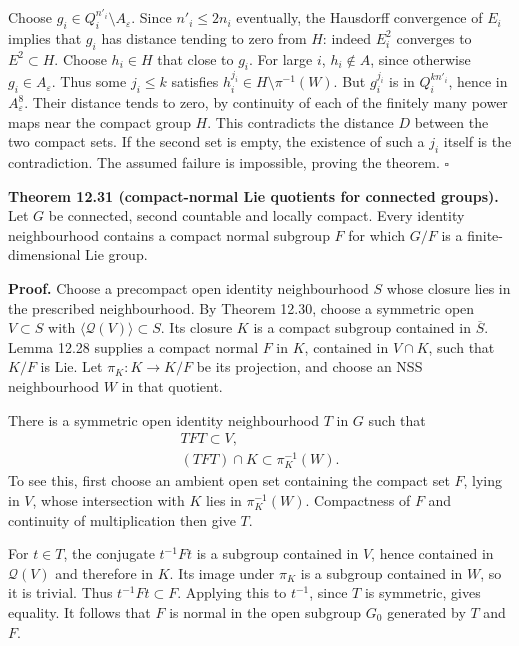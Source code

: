 \documentclass[
  11pt,
]{article}
\begin{document}
Choose \(g_i\in Q_i^{n'_i}\setminus A_\varepsilon\). Since
\(n'_i\leq2n_i\) eventually, the Hausdorff convergence of \(E_i\)
implies that \(g_i\) has distance tending to zero from \(H\): indeed
\(E_i^2\) converges to \(E^2\subset H\). Choose \(h_i\in H\) that close
to \(g_i\). For large \(i\), \(h_i\notin A\), since otherwise
\(g_i\in A_\varepsilon\). Thus some \(j_i\leq k\) satisfies
\(h_i^{j_i}\in H\setminus\pi^{-1}(W)\). But \(g_i^{j_i}\) is in
\(Q_i^{kn'_i}\), hence in \(A_\varepsilon^8\). Their distance tends to
zero, by continuity of each of the finitely many power maps near the
compact group \(H\). This contradicts the distance \(D\) between the two
compact sets. If the second set is empty, the existence of such a
\(j_i\) itself is the contradiction. The assumed failure is impossible,
proving the theorem. \(\square\)

\textbf{Theorem 12.31 (compact-normal Lie quotients for connected
groups).} Let \(G\) be connected, second countable and locally compact.
Every identity neighbourhood contains a compact normal subgroup \(F\)
for which \(G/F\) is a finite-dimensional Lie group.

\textbf{Proof.} Choose a precompact open identity neighbourhood \(S\)
whose closure lies in the prescribed neighbourhood. By Theorem 12.30,
choose a symmetric open \(V\subset S\) with
\(\langle\mathcal Q(V)\rangle\subset S\). Its closure \(K\) is a compact
subgroup contained in \(\overline S\). Lemma 12.28 supplies a compact
normal \(F\) in \(K\), contained in \(V\cap K\), such that \(K/F\) is
Lie. Let \(\pi_K:K\to K/F\) be its projection, and choose an NSS
neighbourhood \(W\) in that quotient.

There is a symmetric open identity neighbourhood \(T\) in \(G\) such
that \[
\begin{gathered}
TFT\subset V,\\
(TFT)\cap K\subset\pi_K^{-1}(W).
\end{gathered}
\tag{12.113}
\] To see this, first choose an ambient open set containing the compact
set \(F\), lying in \(V\), whose intersection with \(K\) lies in
\(\pi_K^{-1}(W)\). Compactness of \(F\) and continuity of multiplication
then give \(T\).

For \(t\in T\), the conjugate \(t^{-1}Ft\) is a subgroup contained in
\(V\), hence contained in \(\mathcal Q(V)\) and therefore in \(K\). Its
image under \(\pi_K\) is a subgroup contained in \(W\), so it is
trivial. Thus \(t^{-1}Ft\subset F\). Applying this to \(t^{-1}\), since
\(T\) is symmetric, gives equality. It follows that \(F\) is normal in
the open subgroup \(G_0\) generated by \(T\) and \(F\).
\end{document}
